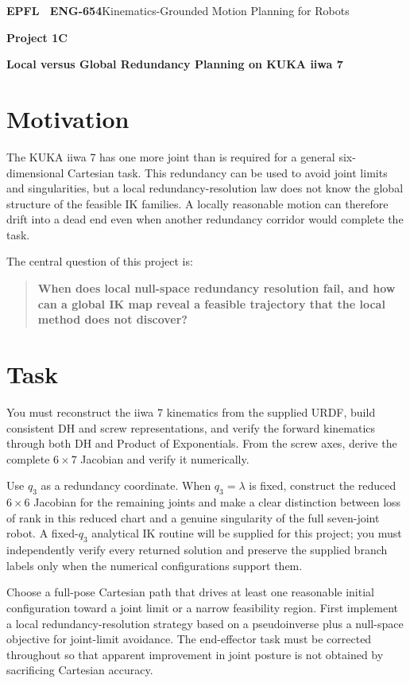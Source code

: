 \documentclass[11pt,a4paper]{article}
\begin{document}
{\small\textbf{EPFL \textbar\ ENG-654}\hfill Kinematics-Grounded Motion Planning for Robots}
\vspace{5mm}

{\color{epflred}\Large\bfseries Project 1C}

{\LARGE\bfseries Local versus Global Redundancy Planning on KUKA iiwa 7\par}

\section*{Motivation}
The KUKA iiwa 7 has one more joint than is required for a general six-dimensional Cartesian task. This redundancy can be used to avoid joint limits and singularities, but a local redundancy-resolution law does not know the global structure of the feasible IK families. A locally reasonable motion can therefore drift into a dead end even when another redundancy corridor would complete the task.

The central question of this project is:

\begin{quote}
\textbf{When does local null-space redundancy resolution fail, and how can a global IK map reveal a feasible trajectory that the local method does not discover?}
\end{quote}

\section*{Task}
You must reconstruct the iiwa 7 kinematics from the supplied URDF, build consistent DH and screw representations, and verify the forward kinematics through both DH and Product of Exponentials. From the screw axes, derive the complete $6\times7$ Jacobian and verify it numerically.

Use $q_3$ as a redundancy coordinate. When $q_3=\lambda$ is fixed, construct the reduced $6\times6$ Jacobian for the remaining joints and make a clear distinction between loss of rank in this reduced chart and a genuine singularity of the full seven-joint robot. A fixed-$q_3$ analytical IK routine will be supplied for this project; you must independently verify every returned solution and preserve the supplied branch labels only when the numerical configurations support them.

Choose a full-pose Cartesian path that drives at least one reasonable initial configuration toward a joint limit or a narrow feasibility region. First implement a local redundancy-resolution strategy based on a pseudoinverse plus a null-space objective for joint-limit avoidance. The end-effector task must be corrected throughout so that apparent improvement in joint posture is not obtained by sacrificing Cartesian accuracy.
\end{document}

